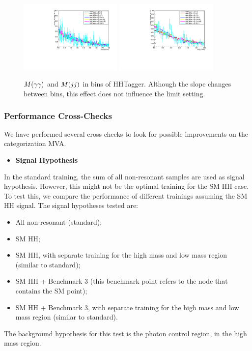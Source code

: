\begin{figure}[h]
  \centering
  \includegraphics[width=0.45\textwidth]{figures/sec-cats/mva/hhtag_mgg}\hfil
  \includegraphics[width=0.45\textwidth]{figures/sec-cats/mva/hhtag_mjj}\hfil
  \caption{$M(\gamma\gamma)$ and $M(jj)$ in bins of HHTagger. Although the slope changes between bins, this effect does not influence the limit setting.}
  \label{fig:mva_mggmjj}
\end{figure}

\subsubsection{Performance Cross-Checks}

We have performed several cross checks to look for possible improvements on the categorization MVA. 

\begin{itemize}
\item \textbf{Signal Hypothesis}
\end{itemize}

In the standard training, the sum of all non-resonant samples are used as signal hypothesis. 
However, this might not be the optimal training for the SM HH case. 
To test this, we compare the performance of different trainings assuming the SM HH signal. 
The signal hypotheses tested are:
\begin{itemize}
\item All non-resonant (standard);
\item SM HH;
\item SM HH, with separate training for the high mass and low mass region (similar to standard);
\item SM HH + Benchmark 3 (this benchmark point refers to the node that contains the SM point);
\item SM HH + Benchmark 3, with separate training for the high mass and low mass region (similar to standard).
\end{itemize}
The background hypothesis for this test is the photon control region, in the high mass region. 

